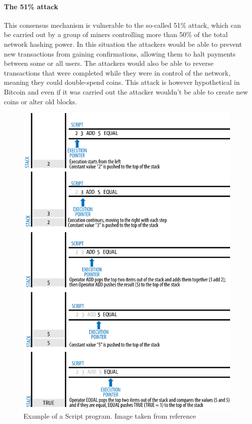 \paragraph{The 51\% attack} This consensus mechanism is vulnerable to the
so-called 51\% attack, which can be carried out by a group of miners controlling
more than 50\% of the total network hashing power. In this situation the
attackers would be able to prevent new transactions from gaining confirmations,
allowing them to halt payments between some or all users. The attackers would
also be able to reverse transactions that were completed while they were in
control of the network, meaning they could double-spend coins. This attack is
however hypothetical in Bitcoin and even if it was carried out the attacker
wouldn't be able to create new coins or alter old blocks.






















\begin{figure}[b]
	\centering
	\includegraphics[width=1\linewidth]{img/transaction-script-example.png}
	\caption{Example of a Script program. Image taken from reference \cite{antonopoulos2017mastering}}
	\label{fig:script-example}
\end{figure}
